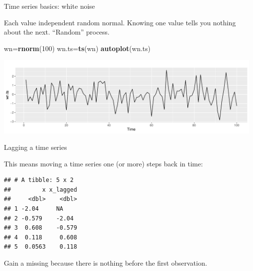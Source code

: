 \documentclass[
  ignorenonframetext,
]{beamer}
\newenvironment{Shaded}{\begin{snugshade}}{\end{snugshade}}
\newcommand{\DataTypeTok}[1]{\textcolor[rgb]{0.13,0.29,0.53}{#1}}
\newcommand{\DecValTok}[1]{\textcolor[rgb]{0.00,0.00,0.81}{#1}}
\newcommand{\KeywordTok}[1]{\textcolor[rgb]{0.13,0.29,0.53}{\textbf{#1}}}
\newcommand{\NormalTok}[1]{#1}
\newcommand{\OperatorTok}[1]{\textcolor[rgb]{0.81,0.36,0.00}{\textbf{#1}}}
\newcommand{\StringTok}[1]{\textcolor[rgb]{0.31,0.60,0.02}{#1}}
\begin{document}
\begin{frame}[fragile]{Time series basics: white noise}
\protect\hypertarget{time-series-basics-white-noise}{}

Each value independent random normal. Knowing one value tells you
nothing about the next. ``Random'' process.

\begin{Shaded}
\begin{Highlighting}[]
\NormalTok{wn=}\KeywordTok{rnorm}\NormalTok{(}\DecValTok{100}\NormalTok{)}
\NormalTok{wn.ts=}\KeywordTok{ts}\NormalTok{(wn)}
\KeywordTok{autoplot}\NormalTok{(wn.ts)}
\end{Highlighting}
\end{Shaded}

\includegraphics{slides_d29_files/figure-beamer/White-Noise-1.pdf}

\end{frame}

\begin{frame}[fragile]{Lagging a time series}
\protect\hypertarget{lagging-a-time-series}{}

This means moving a time series one (or more) steps back in time:

\begin{Shaded}
\end{Shaded}

\begin{verbatim}
## # A tibble: 5 x 2
##         x x_lagged
##     <dbl>    <dbl>
## 1 -2.04     NA    
## 2 -0.579    -2.04 
## 3  0.608    -0.579
## 4  0.118     0.608
## 5  0.0563    0.118
\end{verbatim}

Gain a missing because there is nothing before the first observation.

\end{frame}
\end{document}
